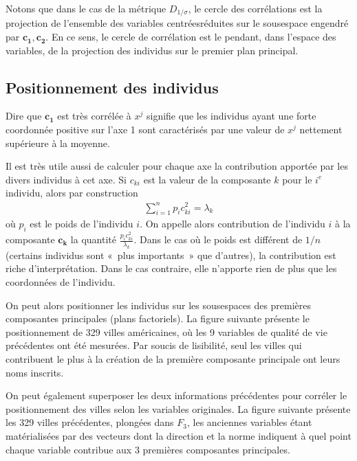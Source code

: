 \documentclass[letterpaper,10pt,french]{sphinxmanual}
\begin{document}
\sphinxAtStartPar
Notons que dans le cas de la métrique \(D_{1/\sigma}\), le cercle des corrélations est la projection de l’ensemble des variables centrées\sphinxhyphen{}réduites sur le sous\sphinxhyphen{}espace engendré par \(\mathbf{c_1},\mathbf{c_2}\). En ce sens, le cercle de corrélation est le pendant, dans l’espace des variables, de la projection des individus sur le premier plan principal.


\subsection{Positionnement des individus}
\label{\detokenize{acp:positionnement-des-individus}}
\sphinxAtStartPar
Dire que \(\mathbf{c_1}\) est très corrélée à \(x^j\) signifie que les individus ayant une forte coordonnée positive sur l’axe 1 sont caractérisés par une valeur de \(x^j\) nettement supérieure à la moyenne.

\sphinxAtStartPar
Il est très utile aussi de calculer pour chaque axe la contribution apportée par les divers individus à cet axe. Si \(c_{ki}\) est la valeur de la composante \(k\) pour le \(i^e\) individu, alors par construction
\begin{equation*}
\begin{split}\displaystyle\sum_{i=1}^np_ic_{ki}^2=\lambda_k\end{split}
\end{equation*}
\sphinxAtStartPar
où \(p_i\) est le poids de l’individu \(i\). On appelle alors contribution de l’individu \(i\) à la composante \(\mathbf{c_k}\) la quantité \(\frac{p_ic_{ki}^2}{\lambda_k}\). Dans le cas où le poids est différent de \(1/n\) (certains individus sont « plus importants » que d’autres), la contribution est riche d’interprétation. Dans le cas contraire, elle n’apporte rien de plus que les coordonnées de l’individu.

\sphinxAtStartPar
On peut alors positionner les individus sur les sous\sphinxhyphen{}espaces des premières composantes principales (plans factoriels). La figure suivante présente le positionnement de 329 villes américaines, où les 9 variables de qualité de vie précédentes ont été mesurées. Par soucis de lisibilité, seul les villes qui contribuent le plus à la création de la première composante principale ont leurs noms inscrits.

\sphinxAtStartPar
{}

\sphinxAtStartPar
On peut également superposer les deux informations précédentes pour corréler le positionnement des villes selon les variables originales. La figure suivante présente les 329 villes précédentes, plongées dans \(F_3\), les  anciennes variables étant matérialisées par des vecteurs dont la direction et la norme indiquent à quel point chaque variable contribue aux 3 premières composantes principales.
\end{document}
